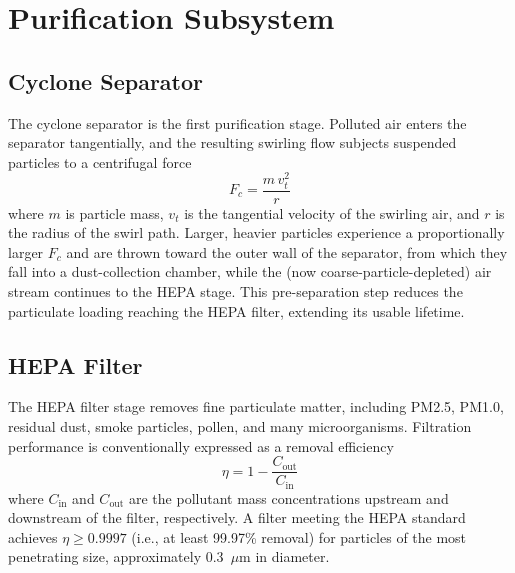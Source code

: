 \FloatBarrier

\section{Purification Subsystem}
\label{sec:meth-purification}

\subsection{Cyclone Separator}
The cyclone separator is the first purification stage. Polluted air enters the separator tangentially, and the resulting swirling flow subjects suspended particles to a centrifugal force
\begin{equation}
F_c = \frac{m\,v_t^2}{r}
\label{eq:centrifugal}
\end{equation}
where $m$ is particle mass, $v_t$ is the tangential velocity of the swirling air, and $r$ is the radius of the swirl path. Larger, heavier particles experience a proportionally larger $F_c$ and are thrown toward the outer wall of the separator, from which they fall into a dust-collection chamber, while the (now coarse-particle-depleted) air stream continues to the HEPA stage. This pre-separation step reduces the particulate loading reaching the HEPA filter, extending its usable lifetime.

\subsection{HEPA Filter}
The HEPA filter stage removes fine particulate matter, including PM2.5, PM1.0, residual dust, smoke particles, pollen, and many microorganisms. Filtration performance is conventionally expressed as a removal efficiency
\begin{equation}
\eta = 1 - \frac{C_{\text{out}}}{C_{\text{in}}}
\label{eq:hepa-efficiency}
\end{equation}
where $C_{\text{in}}$ and $C_{\text{out}}$ are the pollutant mass concentrations upstream and downstream of the filter, respectively. A filter meeting the HEPA standard achieves $\eta \geq 0.9997$ (i.e., at least 99.97\% removal) for particles of the most penetrating size, approximately 0.3~$\mu$m in diameter.

